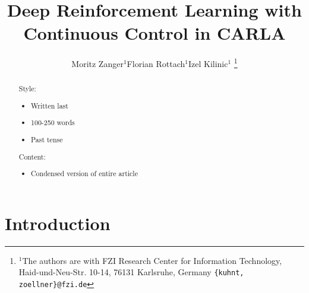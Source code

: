 \documentclass[letterpaper, 10 pt, conference]{ieeeconf}  %
\title{\LARGE \bf
Deep Reinforcement Learning with Continuous Control in CARLA
}
\author{Moritz Zanger$^{1}$Florian Rottach$^{1}$Izel Kilinic$^{1}$ %
\thanks{$^{1}$The authors are with FZI Research Center for Information Technology, Haid-und-Neu-Str. 10-14, 76131 Karlsruhe, Germany
        {\tt\small \{kuhnt, zoellner\}@fzi.de}}%
}
\begin{document}
\maketitle
\thispagestyle{empty}
\pagestyle{empty}


\begin{abstract}


Style:
\begin{itemize}
	\item Written last
	\item 100-250 words
	\item Past tense
\end{itemize}

Content:
\begin{itemize}
	\item Condensed version of entire article
\end{itemize}

\end{abstract}


\section{Introduction}

\end{document}
